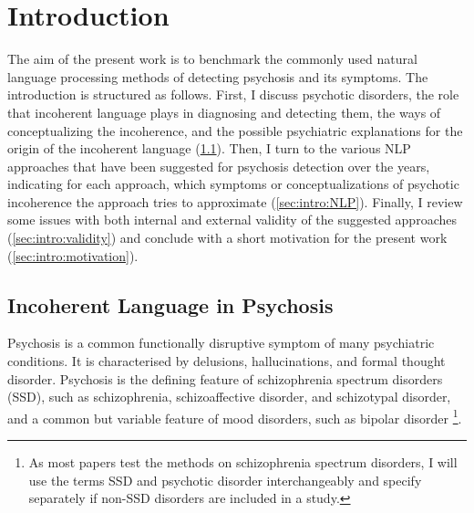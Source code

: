 
\chapter{Introduction} %
\label{chap:1:intro}

The aim of the present work is to benchmark the commonly used natural language processing methods of detecting psychosis and its symptoms. The introduction is structured as follows. First, I discuss psychotic disorders, the role that incoherent language plays in diagnosing and detecting them, the ways of conceptualizing the incoherence, and the possible psychiatric explanations for the origin of the incoherent language (\ref{sec:intro:psychosis}). Then, I turn to the various NLP approaches that have been suggested for psychosis detection over the years, indicating for each approach, which symptoms or conceptualizations of psychotic incoherence the approach tries to approximate (\ref{sec:intro:NLP}). Finally, I review some issues with both internal and external validity of the suggested approaches (\ref{sec:intro:validity}) and conclude with a short motivation for the present work (\ref{sec:intro:motivation}).



\section{Incoherent Language in Psychosis}
\label{sec:intro:psychosis}

Psychosis is a common functionally disruptive symptom of many psychiatric conditions. It is characterised by delusions, hallucinations, and formal thought disorder.  Psychosis is the defining feature of schizophrenia spectrum disorders (SSD), such as schizophrenia, schizoaffective disorder, and schizotypal disorder, and a common but variable feature of mood disorders, such as bipolar disorder \citep{arciniegas2015psychosis}\footnote{As most papers test the methods on schizophrenia spectrum disorders, I will use the terms SSD and psychotic disorder interchangeably and specify separately if non-SSD disorders are included in a study.}.


